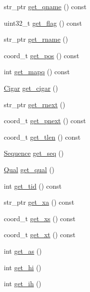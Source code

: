 \begin{DoxyCompactItemize}
\item 
str\_\-ptr \hyperlink{class_b_a_m_read_a6d9d5003de72a18427480e2ffcbd75fc}{get\_\-qname} () const 
\item 
uint32\_\-t \hyperlink{class_b_a_m_read_a6a6794d5f7cd8f42b00cc933ea0c8f15}{get\_\-flag} () const 
\item 
str\_\-ptr \hyperlink{class_b_a_m_read_abfa160a0de8d874f5209e39efd796eac}{get\_\-rname} ()
\item 
coord\_\-t \hyperlink{class_b_a_m_read_ad0eabedce37189ad45ba29eadbee550a}{get\_\-pos} () const 
\item 
int \hyperlink{class_b_a_m_read_a6e53eeaa3db0034c9094402c89730b28}{get\_\-mapq} () const 
\item 
\hyperlink{class_cigar}{Cigar} \hyperlink{class_b_a_m_read_a887a47130c84d01b2f114fca460816e5}{get\_\-cigar} ()
\item 
str\_\-ptr \hyperlink{class_b_a_m_read_ac240b76b0e03ab6b55c20194b056d065}{get\_\-rnext} ()
\item 
coord\_\-t \hyperlink{class_b_a_m_read_a0281ad0d64a15d874314ffe15c98c615}{get\_\-pnext} () const 
\item 
coord\_\-t \hyperlink{class_b_a_m_read_a773f27591a8141752326458aa5942352}{get\_\-tlen} () const 
\item 
\hyperlink{class_sequence}{Sequence} \hyperlink{class_b_a_m_read_ad368179a81717f7770caf071f8497c33}{get\_\-seq} ()
\item 
\hyperlink{class_qual}{Qual} \hyperlink{class_b_a_m_read_ae1310c47ffebba2974b2e17424f3d45b}{get\_\-qual} ()
\item 
int \hyperlink{class_b_a_m_read_a04421480527f25f49e0cec5ad248cf4f}{get\_\-tid} () const 
\item 
str\_\-ptr \hyperlink{class_b_a_m_read_a358fbd29d88ad606659cac981102e03a}{get\_\-xa} () const 
\item 
coord\_\-t \hyperlink{class_b_a_m_read_ad0a0a8ccc29cd8329056e006e75d32be}{get\_\-xs} () const 
\item 
coord\_\-t \hyperlink{class_b_a_m_read_a98e60253d0a82bc31c39ce73404f31d3}{get\_\-xt} () const 
\item 
int \hyperlink{class_b_a_m_read_aa713b4e990bd25a99cb6cb6ccaba7ac8}{get\_\-as} ()
\item 
int \hyperlink{class_b_a_m_read_aaa3950f12efb6682676829ea61b59d6d}{get\_\-hi} ()
\item 
int \hyperlink{class_b_a_m_read_a040e66330ed38e9ac2a5080029ce522f}{get\_\-ih} ()
\item 

\end{DoxyCompactItemize}
